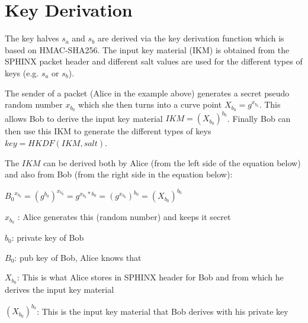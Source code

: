 \section{Key Derivation} \label{KeyDerivation}

The key halves $s_a$ and $s_b$ are derived via the  key derivation function which is based on HMAC-SHA256. The input key material (IKM) is obtained from the SPHINX packet header and different salt values are used for the different types of keys (e.g. $s_a$ or $s_b$).

The sender of a packet (Alice in the example above) generates a secret pseudo random number $x_{b_0}$ which she then turns into a curve point $X_{b_0} = g^{x_{b_0}}$. This allows Bob to derive the input key material $IKM = (X_{b_0})^{b_0}$. Finally Bob can then use this IKM to generate the different types of keys $key=HKDF(IKM, salt)$.

The $IKM$ can be derived both by Alice (from the left side of the equation below) and also from Bob (from the right side in the equation below):

${B_0}^{x_{b_0}} = (g^{b_0})^{x_{b_0}} = g^{x_{b_0} * b_0} = (g^{x_{b_0}})^{b_0} = (X_{b_0})^{b_0}$

$x_{b_0}$ : Alice generates this (random number) and keeps it secret

$b_0$: private key of Bob

$B_0$: pub key of Bob, Alice knows that

$X_{b_0}$: This is what Alice stores in SPHINX header for Bob and from which he derives the input key material

$(X_{b_0})^{b_0}$: This is the input key material that Bob derives with his private key
